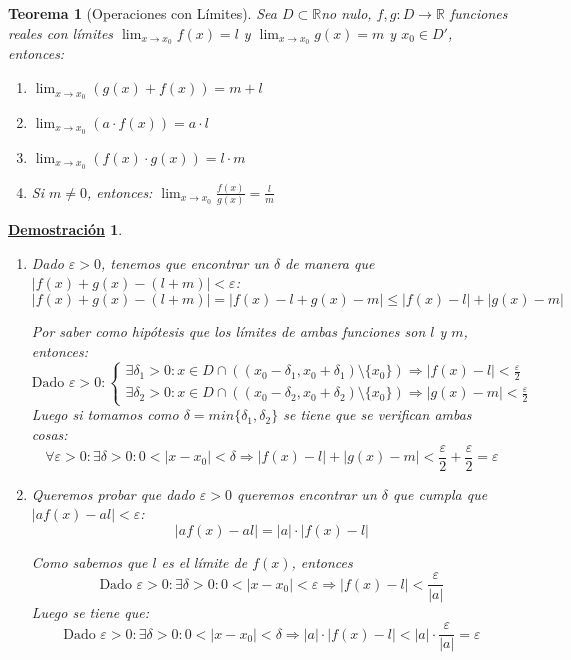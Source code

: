 \documentclass[10pt,a4paper,openright]{book}
\theoremstyle{break}
\newtheorem{theo}{Teorema}[chapter]
\newtheorem*{demo}{\underline{Demostración}}
\begin{document}
\begin{theo}[Operaciones con Límites]
Sea $D\subset \mathbb R$no nulo, $f, g: D\longrightarrow \mathbb R$ funciones reales con límites $\lim_{x\rightarrow x_0}f(x)=l$ y $\lim_{x\rightarrow x_0}g(x)=m$ y $x_0\in D'$, entonces:
\begin{enumerate}
\item $\lim_{x\rightarrow x_0}(g(x)+f(x))=m+l$
\item $\lim_{x\rightarrow x_0}(a\cdot f(x))=a\cdot l$
\item $\lim_{x\rightarrow x_0}(f(x)\cdot g(x))=l\cdot m$
\item Si $m\neq 0$, entonces: $\lim_{x\rightarrow x_0}\frac{f(x)}{g(x)}=\frac{l}{m}$
\end{enumerate}
\end{theo}
\begin{demo}
\begin{enumerate}
\item Dado $\varepsilon>0$, tenemos que encontrar un $\delta$ de manera que $|f(x)+g(x)-(l+m)|<\varepsilon$:
$$|f(x)+g(x)-(l+m)|=|f(x)-l+g(x)-m|\leq |f(x)-l|+|g(x)-m|$$

Por saber como hipótesis que los límites de ambas funciones son $l$ y $m$, entonces:
$$\mbox{Dado }\varepsilon>0:\begin{cases} \exists \delta_1>0: x\in D\cap \left((x_0-\delta_1, x_0+\delta_1)\mbox{\textbackslash}\{x_0\}\right)\Rightarrow |f(x)-l|<\frac{\varepsilon}{2}\\ \exists \delta_2>0: x\in D\cap \left((x_0-\delta_2, x_0+\delta_2)\mbox{\textbackslash}\{x_0\}\right)\Rightarrow |g(x)-m|<\frac{\varepsilon}{2}\end{cases}$$
Luego si tomamos como $\delta=min\{\delta_1,\delta_2\}$ se tiene que se verifican ambas cosas:
$$\forall \varepsilon>0: \exists \delta>0: 0<|x-x_0|<\delta\Rightarrow |f(x)-l|+|g(x)-m|<\frac{\varepsilon}{2}+\frac{\varepsilon}{2}=\varepsilon$$

\item Queremos probar que dado $\varepsilon>0$ queremos encontrar un $\delta$ que cumpla que $|af(x)-al|<\varepsilon$:
$$|af(x)-al|=|a|\cdot |f(x)-l|$$

Como sabemos que $l$ es el límite de $f(x)$, entonces
$$\mbox{Dado }\varepsilon>0: \exists \delta>0: 0<|x-x_0|<\varepsilon\Rightarrow |f(x)-l|<\frac{\varepsilon}{|a|}$$
Luego se tiene que:
$$\mbox{Dado }\varepsilon>0: \exists \delta>0: 0<|x-x_0|<\delta\Rightarrow |a|\cdot |f(x)-l|< |a|\cdot \frac{\varepsilon}{|a|}=\varepsilon$$


\end{enumerate}
\end{demo}
\end{document}
